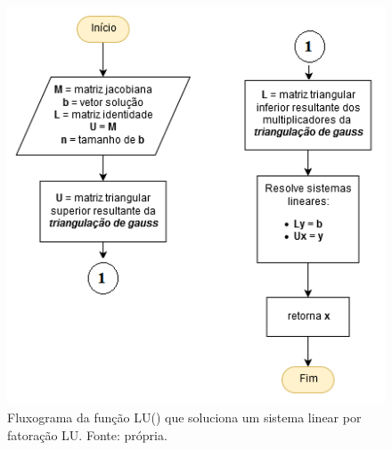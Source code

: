 \documentclass[a4paper, 12pt, openright, oneside]{article}
\begin{document}
\begin{figure}[!htb]
\centering
\includegraphics[scale=0.7]{Imagens/diag_LU1.png}
\caption{Fluxograma da função LU() que soluciona um sistema linear por fatoração LU. Fonte: própria.}
\label{galvanometro}
\end{figure}

\newpage
\end{document}
